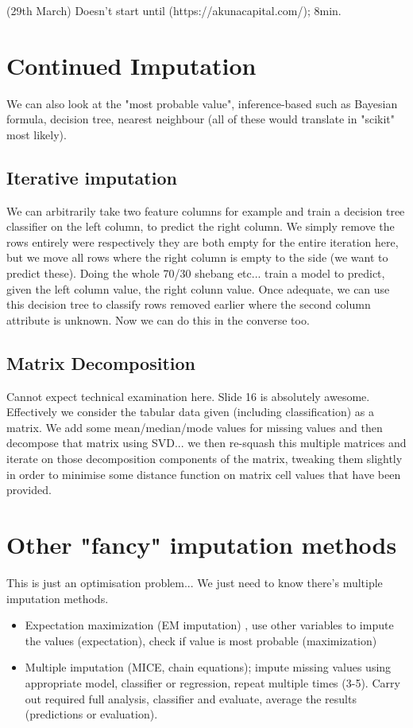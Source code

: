 \documentclass{article}
\begin{document}
(29th March) Doesn't start until (https://akunacapital.com/); 8min.
\section{Continued Imputation}
We can also look at the "most probable value", inference-based such as Bayesian formula, decision tree, nearest neighbour (all of these would translate in "scikit" most likely).

\subsection{Iterative imputation}
We can arbitrarily take two feature columns for example and train a decision tree classifier on the left column, to predict the right column. We simply remove the rows entirely were respectively they are both empty for the entire iteration here, but we move all rows where the right column is empty to the side (we want to predict these). Doing the whole 70/30 shebang etc... train a model to predict, given the left column value, the right colunn value. Once adequate, we can use this decision tree to classify rows removed earlier where the second column attribute is unknown. Now we can do this in the converse too.

\subsection{Matrix Decomposition}
Cannot expect technical examination here. Slide 16 is absolutely awesome. Effectively we consider the tabular data given (including classification) as a matrix. We add some mean/median/mode values for missing values and then decompose that matrix using SVD... we then re-squash this multiple matrices and iterate on those decomposition components of the matrix, tweaking them slightly in order to minimise some distance function on matrix cell values that have been provided.

\section{Other "fancy" imputation methods}
This is just an optimisation problem... We just need to know there's multiple imputation methods.

\begin{itemize}
	\item Expectation maximization (EM imputation) , use other variables to impute the values (expectation), check if value is most probable (maximization)
	\item Multiple imputation (MICE, chain equations); impute missing values using appropriate model, classifier or regression, repeat multiple times (3-5). Carry  out required full analysis, classifier and evaluate, average the results (predictions or evaluation).
\end{itemize}
\end{document}
